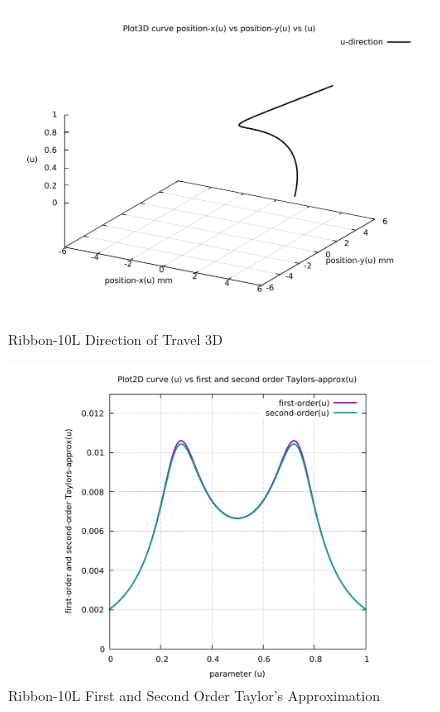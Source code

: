 \begin{figure}
	\caption     {Ribbon-10L Direction of Travel 3D}
	\label{04-img-Ribbon-10L Direction of Travel 3D.pdf}
	\includegraphics[width=1.00\textwidth]{Chap4/appendix/app-Ribbon-10L/plots/04-img-Ribbon-10L Direction of Travel 3D.pdf}
\end{figure}

\clearpage
\pagebreak

\begin{figure}
	\caption     {Ribbon-10L First and Second Order Taylor's Approximation}
	\label{05-img-Ribbon-10L-First-and-Second-Order-Taylors-Approx.pdf}
	\includegraphics[width=1.00\textwidth]{Chap4/appendix/app-Ribbon-10L/plots/05-img-Ribbon-10L-First-and-Second-Order-Taylors-Approx.pdf}
\end{figure}


